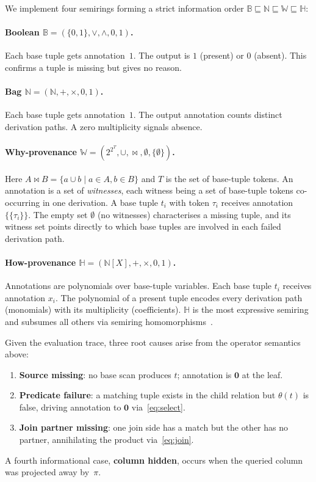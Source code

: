 \documentclass{llncs}
\begin{document}
We implement four semirings forming a strict information order
$\mathbb{B} \sqsubseteq \mathbb{N} \sqsubseteq \mathbb{W} \sqsubseteq \mathbb{H}$:

\paragraph{Boolean $\mathbb{B} = (\{0,1\}, \vee, \wedge, 0, 1)$.}
Each base tuple gets annotation~$1$. The output is $1$ (present) or
$0$ (absent). This confirms a tuple is missing but gives no reason.

\paragraph{Bag $\mathbb{N} = (\mathbb{N}, +, \times, 0, 1)$.}
Each base tuple gets annotation~$1$. The output annotation counts
distinct derivation paths. A zero multiplicity signals absence.

\paragraph{Why-provenance $\mathbb{W} = (2^{2^T}, \cup, \bowtie, \emptyset, \{\emptyset\})$.}
Here $A \bowtie B = \{a \cup b \mid a \in A, b \in B\}$ and $T$ is the
set of base-tuple tokens. An annotation is a set of \emph{witnesses},
each witness being a set of base-tuple tokens co-occurring in one
derivation. A base tuple $t_i$ with token $\tau_i$ receives annotation
$\{\{\tau_i\}\}$. The empty set $\emptyset$ (no witnesses) characterises
a missing tuple, and its witness set points directly to which base
tuples are involved in each failed derivation path.

\paragraph{How-provenance $\mathbb{H} = (\mathbb{N}[X], +, \times, 0, 1)$.}
Annotations are polynomials over base-tuple variables. Each base tuple
$t_i$ receives annotation $x_i$. The polynomial of a present tuple
encodes every derivation path (monomials) with its multiplicity
(coefficients). $\mathbb{H}$ is the most expressive semiring and
subsumes all others via semiring homomorphisms~\cite{Green2007}.

Given the evaluation trace, three root causes arise from the operator
semantics above:
\begin{enumerate}
  \item \textbf{Source missing}: no base scan produces $t$; annotation
    is $\mathbf{0}$ at the leaf.
  \item \textbf{Predicate failure}: a matching tuple exists in the child
    relation but $\theta(t)$ is false, driving annotation to $\mathbf{0}$
    via~\eqref{eq:select}.
  \item \textbf{Join partner missing}: one join side has a match but the
    other has no partner, annihilating the product via~\eqref{eq:join}.
\end{enumerate}
A fourth informational case, \textbf{column hidden}, occurs when the
queried column was projected away by~$\pi$.
\end{document}
